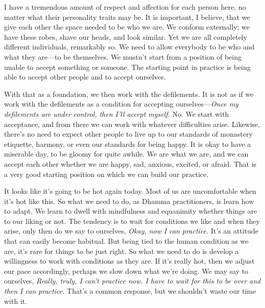 I have a tremendous amount of respect and affection for each person 
here, no matter what their personality traits may be. It is important, 
I believe, that we give each other the space needed to be who we are. 
We conform externally; we have these robes, shave our heads, and look 
similar. Yet we are all completely different individuals, remarkably 
so. We need to allow everybody to be who and what they are---to be 
themselves. We mustn't start from a position of being unable to accept 
something or someone. The starting point in practice is being able to 
accept other people and to accept ourselves.

With that as a foundation, we then work with the defilements. It is not 
as if we work with the defilements as a condition for accepting 
ourselves---\emph{Once my defilements are under control, then I'll 
accept myself.} No. We start with acceptance, and from there we can 
work with whatever difficulties arise. Likewise, there's no need to 
expect other people to live up to our standards of monastery etiquette, 
harmony, or even our standards for being happy. It is okay to have a 
miserable day, to be gloomy for quite awhile. We are what we are, and 
we can accept each other whether we are happy, sad, anxious, excited, 
or afraid. That is a very good starting position on which we can build 
our practice.


It looks like it's going to be hot again today. Most of us are 
uncomfortable when it's hot like this. So what we need to do, as Dhamma 
practitioners, is learn how to adapt. We learn to dwell with 
mindfulness and equanimity whether things are to our liking or not. The 
tendency is to wait for conditions we like and when they arise, only 
then do we say to ourselves, \emph{Okay, now I can practice.} It's an 
attitude that can easily become habitual. But being tied to the human 
condition as we are, it's rare for things to be just right. So what we 
need to do is develop a willingness to work with conditions as they 
are. If it's really hot, then we adjust our pace accordingly, perhaps 
we slow down what we're doing. We may say to ourselves, \emph{Really, 
truly, I can't practice now. I have to wait for this to be over and 
then I can practice.} That's a common response, but we shouldn't waste 
our time with it.

